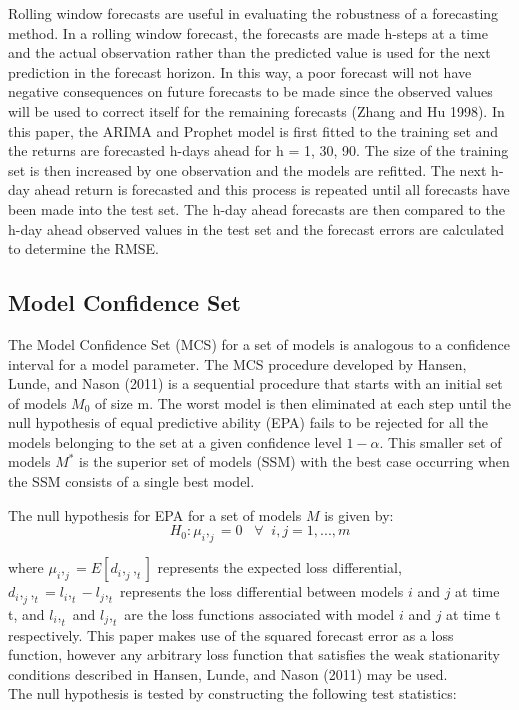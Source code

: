 \documentclass[12pt,a4paper]{article}
\numberwithin{equation}{section}
\numberwithin{figure}{section}
\numberwithin{table}{section}
\begin{document}
Rolling window forecasts are useful in evaluating the robustness of a
forecasting method. In a rolling window forecast, the forecasts are made
h-steps at a time and the actual observation rather than the predicted
value is used for the next prediction in the forecast horizon. In this
way, a poor forecast will not have negative consequences on future
forecasts to be made since the observed values will be used to correct
itself for the remaining forecasts (Zhang and Hu 1998). In this paper,
the ARIMA and Prophet model is first fitted to the training set and the
returns are forecasted h-days ahead for h = 1, 30, 90. The size of the
training set is then increased by one observation and the models are
refitted. The next h-day ahead return is forecasted and this process is
repeated until all forecasts have been made into the test set. The h-day
ahead forecasts are then compared to the h-day ahead observed values in
the test set and the forecast errors are calculated to determine the
RMSE.

\subsection{Model Confidence Set}\label{model-confidence-set}

The Model Confidence Set (MCS) for a set of models is analogous to a
confidence interval for a model parameter. The MCS procedure developed
by Hansen, Lunde, and Nason (2011) is a sequential procedure that starts
with an initial set of models \(M_0\) of size m. The worst model is then
eliminated at each step until the null hypothesis of equal predictive
ability (EPA) fails to be rejected for all the models belonging to the
set at a given confidence level \(1 - \alpha\). This smaller set of
models \(M^*\) is the superior set of models (SSM) with the best case
occurring when the SSM consists of a single best model.

The null hypothesis for EPA for a set of models \(M\) is given by:
\[H_0: \mu_i,_j = 0 \;\;\; \forall \;\; i,j = 1,...,m\]

where \(\mu_i,_j = E[d_i,_j,_t]\) represents the expected loss
differential, \(d_i,_j,_t = l_i,_t - l_j,_t\) represents the loss
differential between models \(i\) and \(j\) at time t, and \(l_i,_t\)
and \(l_j,_t\) are the loss functions associated with model \(i\) and
\(j\) at time t respectively. This paper makes use of the squared
forecast error as a loss function, however any arbitrary loss function
that satisfies the weak stationarity conditions described in Hansen,
Lunde, and Nason (2011) may be used.\\
The null hypothesis is tested by constructing the following test
statistics:
\end{document}
